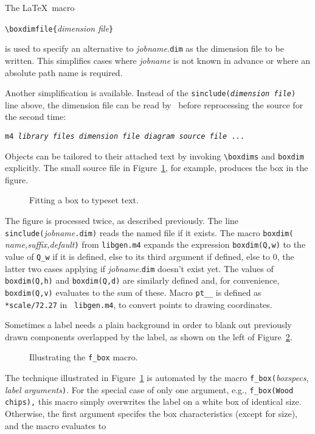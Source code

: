 The \LaTeX\ macro

\verb|\boxdimfile{|{\sl dimension file}\verb|}|

\noindent is used to specify an alternative to {\sl jobname.}\verb|dim| as the
dimension file to be written.  This simplifies cases where {\sl jobname}
is not known in advance or where an absolute path name is required.

Another simplification is available.  Instead of the
{\tt sinclude({\sl dimension file})} line
above, the dimension file can be read by \Mfour\ before reprocessing the source
for the second time:

{\tt m4 {\sl library files} {\sl dimension file} {\sl diagram source file} ...} 

Objects can be tailored to their attached text by invoking
\verb|\boxdims| and \verb|boxdim| explicitly.
The small source file in Figure~\ref{boxdims}, for example,
produces the box in the figure.
\begin{figure}[hbt]
   \parbox{4.2in}{\small  }%
   \hfill\llap{\raise-0.35in\hbox{ }}%
   \vspace{-\baselineskip}
   \caption{Fitting a box to typeset text.}
   \label{boxdims}
   \end{figure}

The figure is processed twice, as described previously.
The line \verb|sinclude(|{\sl jobname}\verb|.dim)| reads the named file
if it exists.  The macro \verb|boxdim(|{\sl
name,suffix,default}\verb|)| from {\tt libgen.m4} expands the
expression \verb|boxdim(Q,w)| to the value of \verb|Q_w| if it is
defined, else to its third argument if defined, else to 0, the latter
two cases applying if {\sl jobname.}\verb|dim| doesn't exist yet.  The
values of \verb|boxdim(Q,h)| and \verb|boxdim(Q,d)| are similarly
defined and, for convenience, \verb|boxdim(Q,v)| evaluates to the sum
of these.  Macro \verb|pt__| is defined as \verb|*scale/72.27| in {\tt
libgen.m4}, to convert points to drawing coordinates.

Sometimes a label needs a plain background in order to blank
out previously drawn components overlapped by the label,
as shown on the left of Figure~\ref{fbox}.
\begin{figure}[hbt]
   
   \vspace{-0.5\baselineskip}
   \caption{Illustrating the {\tt f\_box} macro.}
   \label{fbox}
   \end{figure}
The technique illustrated in Figure~\ref{boxdims} is automated by the
macro
{\tt f\_box(}{\sl boxspecs}, {\sl label arguments}{\tt )}.
For the special case of only one argument,
e.g., {\tt f\_box(Wood chips),} this macro
simply overwrites the label on a white box of identical size.
Otherwise, the first argument specifes the box characteristics
(except for size), and the macro evaluates to

